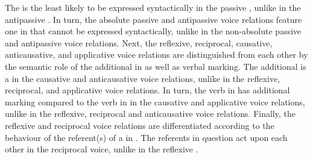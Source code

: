 The  is the least likely  to be expressed syntactically in the passive , unlike in the antipassive . In turn, the absolute passive and antipassive voice relations feature one  in  that cannot be expressed syntactically, unlike in the non-absolute passive and antipassive voice relations. Next, the reflexive, reciprocal, causative, anticausative, and applicative voice relations are distinguished from each other by the semantic role of the additional  in  as well as verbal marking. The additional  is a  in the causative and anticausative voice relations, unlike in the reflexive, reciprocal, and applicative voice relations. In turn, the verb in  has additional marking compared to the verb in  in the causative and applicative voice relations, unlike in the reflexive, reciprocal and anticausative voice relations. Finally, the reflexive and reciprocal voice relations are differentiated according to the behaviour of the referent(s) of a  in . The referents in question act upon each other in the reciprocal voice, unlike in the reflexive .
